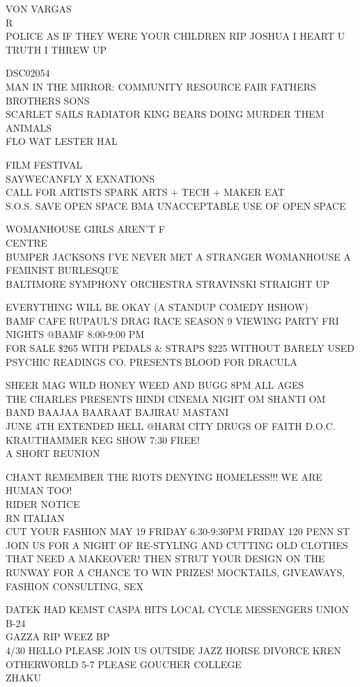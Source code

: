 \documentclass[10pt,letterpaper]{article}
\begin{document}
VON VARGAS\\
R\\
POLICE AS IF THEY WERE YOUR CHILDREN RIP JOSHUA I HEART U\\
TRUTH I THREW UP

DSC02054\\
MAN IN THE MIRROR: COMMUNITY RESOURCE FAIR FATHERS BROTHERS SONS\\
SCARLET SAILS RADIATOR KING BEARS DOING MURDER THEM ANIMALS\\
FLO WAT LESTER HAL

FILM FESTIVAL\\
SAYWECANFLY X EXNATIONS\\
CALL FOR ARTISTS SPARK ARTS + TECH + MAKER EAT\\
S.O.S. SAVE OPEN SPACE BMA UNACCEPTABLE USE OF OPEN SPACE

WOMANHOUSE GIRLS AREN'T F\\
CENTRE\\
BUMPER JACKSONS I'VE NEVER MET A STRANGER WOMANHOUSE A FEMINIST BURLESQUE\\
BALTIMORE SYMPHONY ORCHESTRA STRAVINSKI STRAIGHT UP

EVERYTHING WILL BE OKAY (A STANDUP COMEDY HSHOW)\\
BAMF CAFE RUPAUL'S DRAG RACE SEASON 9 VIEWING PARTY FRI NIGHTS @BAMF 8:00{-}9:00 PM\\
FOR SALE \$265 WITH PEDALS \& STRAPS \$225 WITHOUT BARELY USED\\
PSYCHIC READINGS CO. PRESENTS BLOOD FOR DRACULA

SHEER MAG WILD HONEY WEED AND BUGG 8PM ALL AGES\\
THE CHARLES PRESENTS HINDI CINEMA NIGHT OM SHANTI OM BAND BAAJAA BAARAAT BAJIRAU MASTANI\\
JUNE 4TH EXTENDED HELL @HARM CITY DRUGS OF FAITH D.O.C. KRAUTHAMMER KEG SHOW 7:30 FREE!\\
A SHORT REUNION

CHANT REMEMBER THE RIOTS DENYING HOMELESS!!! WE ARE HUMAN TOO!\\
RIDER NOTICE\\
RN ITALIAN\\
CUT YOUR FASHION MAY 19 FRIDAY 6:30{-}9:30PM FRIDAY 120 PENN ST JOIN US FOR A NIGHT OF RE{-}STYLING AND CUTTING OLD CLOTHES THAT NEED A MAKEOVER!  THEN STRUT YOUR DESIGN ON THE RUNWAY FOR A CHANCE TO WIN PRIZES!  MOCKTAILS, GIVEAWAYS, FASHION CONSULTING, SEX

DATEK HAD KEMST CASPA HITS LOCAL CYCLE MESSENGERS UNION B{-}24\\
GAZZA RIP WEEZ BP\\
4/30 HELLO PLEASE JOIN US OUTSIDE JAZZ HORSE DIVORCE KREN OTHERWORLD 5{-}7 PLEASE GOUCHER COLLEGE\\
ZHAKU
\end{document}

